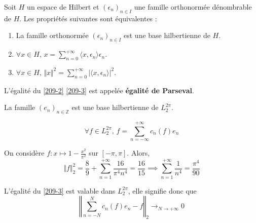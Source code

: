 
  \begin{theorem}
    \label{209-2}
    Soit $H$ un espace de Hilbert et $(\epsilon_n)_{n \in I}$ une famille orthonormée dénombrable de $H$. Les propriétés suivantes sont équivalentes :
    \begin{enumerate}[label={\bfseries(\roman*)}]
      \item La famille orthonormée $(\epsilon_n)_{n \in I}$ est une base hilbertienne de $H$.
      \item $\forall x \in H, \, x = \sum_{n=0}^{+\infty} \langle x, \epsilon_n \rangle \epsilon_n$.
      \item \label{209-3} $\forall x \in H, \, \Vert x \Vert^2 = \sum_{n=0}^{+\infty} \vert \langle x, \epsilon_n \rangle \vert^2$.
    \end{enumerate}
  \end{theorem}

  \begin{remark}
    L'égalité du \cref{209-2} \cref{209-3} est appelée \textbf{égalité de Parseval}.
  \end{remark}


  \begin{theorem}
    La famille $(e_n)_{n \in \mathbb{Z}}$ est une base hilbertienne de $L_2^{2 \pi}$.
  \end{theorem}

  \begin{corollary}
    \label{209-4}
    \[ \forall f \in L_2^{2 \pi}, \, f = \sum_{n = -\infty}^{+\infty} c_n(f) e_n \]
  \end{corollary}


  \begin{example}
    On considère $f : x \mapsto 1 - \frac{x^2}{\pi^2}$ sur $[-\pi, \pi]$. Alors,
    \[ \Vert f \Vert^2_2 = \frac{8}{9} + \sum_{n=1}^{+\infty} \frac{16}{\pi^4 n^4} = \frac{16}{15} \implies \sum_{n=1}^{+\infty} \frac{1}{n^4} = \frac{\pi^4}{90} \]
  \end{example}


  \begin{remark}
    L'égalité du \cref{209-3} est valable dans $L_2^{2\pi}$, elle signifie donc que
    \[ \left\Vert \sum_{n = -N}^{N} c_n(f) e_n - f \right\Vert_2 \longrightarrow_{N \rightarrow +\infty} 0 \]
  \end{remark}

